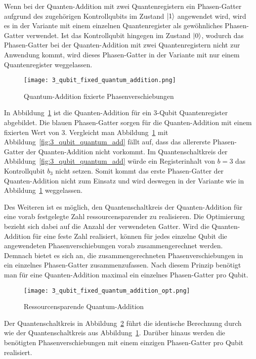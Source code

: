 Wenn bei der Quanten-Addition mit zwei Quantenregistern ein Phasen-Gatter aufgrund des zugehörigen Kontrollqubits im Zustand \(\ket{1}\) angewendet wird,
wird es in der Variante mit einem einzelnen Quantenregister als gewöhnliches Phasen-Gatter verwendet.
Ist das Kontrollqubit hingegen im Zustand \(\ket{0}\), 
wodurch das Phasen-Gatter bei der Quanten-Addition mit zwei Quantenregistern nicht zur Anwendung kommt, 
wird dieses Phasen-Gatter in der Variante mit nur einem Quantenregister weggelassen.

\begin{figure}[H]
  \centering
  \texttt{[image: 3\_qubit\_fixed\_quantum\_addition.png]}
  \caption{Quantum-Addition fixierte Phasenverschiebungen}
  \label{fig:3_qubit_fixed_quantum_addition}
\end{figure}
In Abbildung~\ref{fig:3_qubit_fixed_quantum_addition} ist die Quanten-Addition für ein 3-Qubit Quantenregister abgebildet.
Die blauen Phasen-Gatter sorgen für die Quanten-Addition mit einem fixierten Wert von \(3\).
Vergleicht man Abbildung~\ref{fig:3_qubit_fixed_quantum_addition} mit Abbildung~\ref{fig:3_qubit_quantum_add} fällt auf, 
dass das allererste Phasen-Gatter der Quanten-Addition nicht vorkommt.
Im Quantenschaltkreis der Abbildung~\ref{fig:3_qubit_quantum_add} würde ein Registerinhalt von \(b = 3\) das Kontrollqubit \(b_3\) nicht setzen. 
Somit kommt das erste Phasen-Gatter der Quanten-Addition nicht zum Einsatz und 
wird deswegen in der Variante wie in Abbildung~\ref{fig:3_qubit_fixed_quantum_addition} weggelassen. 

Des Weiteren ist es möglich, 
den Quantenschaltkreis der Quanten-Addition für eine vorab festgelegte Zahl ressourcensparender zu realisieren.
Die Optimierung bezieht sich dabei auf die Anzahl der verwendeten Gatter.
Wird die Quanten-Addition für eine feste Zahl realisiert, 
können für jedes einzelne Qubit die angewendeten Phasenverschiebungen vorab zusammengerechnet werden.
Demnach bietet es sich an, 
die zusammengerechneten Phasenverschiebungen in ein einzelnes Phasen-Gatter zusammenzufassen.
Nach diesem Prinzip benötigt man für eine Quanten-Addition maximal ein einzelnes Phasen-Gatter pro Qubit.

\begin{figure}[H]
  \centering
  \texttt{[image: 3\_qubit\_fixed\_quantum\_addition\_opt.png]}
  \caption{Ressourcensparende Quantum-Addition}
  \label{fig:3_qubit_fixed_quantum_addition_opt}
\end{figure}
Der Quantenschaltkreis in Abbildung~\ref{fig:3_qubit_fixed_quantum_addition_opt} führt die identische 
Berechnung durch wie der Quantenschaltkreis aus Abbildung~\ref{fig:3_qubit_fixed_quantum_addition}.
Darüber hinaus werden die benötigten Phasenverschiebungen mit einem einzigen Phasen-Gatter pro Qubit realisiert.

